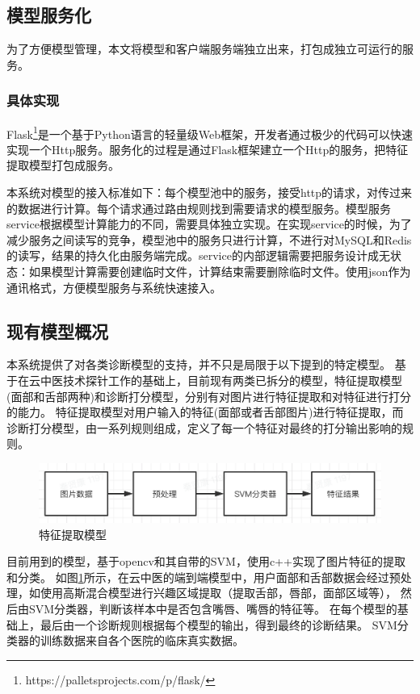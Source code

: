\subsection{模型服务化}
为了方便模型管理，本文将模型和客户端服务端独立出来，打包成独立可运行的服务。

\subsubsection{具体实现}
Flask\footnote{https://palletsprojects.com/p/flask/}是一个基于Python语言的轻量级Web框架，开发者通过极少的代码可以快速实现一个Http服务。服务化的过程是通过Flask框架建立一个Http的服务，把特征提取模型打包成服务。

本系统对模型的接入标准如下：每个模型池中的服务，接受http的请求，对传过来的数据进行计算。每个请求通过路由规则找到需要请求的模型服务。模型服务service根据模型计算能力的不同，需要具体独立实现。在实现service的时候，为了减少服务之间读写的竞争，模型池中的服务只进行计算，不进行对MySQL和Redis的读写，结果的持久化由服务端完成。service的内部逻辑需要把服务设计成无状态：如果模型计算需要创建临时文件，计算结束需要删除临时文件。使用json作为通讯格式，方便模型服务与系统快速接入。

\subsection{现有模型概况}
本系统提供了对各类诊断模型的支持，并不只是局限于以下提到的特定模型。
基于在云中医技术探针工作的基础上，目前现有两类已拆分的模型，特征提取模型(面部和舌部两种)和诊断打分模型，分别有对图片进行特征提取和对特征进行打分的能力。
特征提取模型对用户输入的特征(面部或者舌部图片)进行特征提取，而诊断打分模型，由一系列规则组成，定义了每一个特征对最终的打分输出影响的规则。

\begin{figure}[ht]
    \centering
    \includegraphics[width=15cm]{images/model.png}
    \caption{特征提取模型}
    \label{fig:my_model}
\end{figure}
目前用到的模型，基于opencv和其自带的SVM，使用c++实现了图片特征的提取和分类。
如图\ref{fig:my_model}所示，在云中医的端到端模型中，用户面部和舌部数据会经过预处理，如使用高斯混合模型进行兴趣区域提取（提取舌部，唇部，面部区域等），
然后由SVM分类器，判断该样本中是否包含嘴唇、嘴唇的特征等。
在每个模型的基础上，最后由一个诊断规则根据每个模型的输出，得到最终的诊断结果。
SVM分类器的训练数据来自各个医院的临床真实数据。


